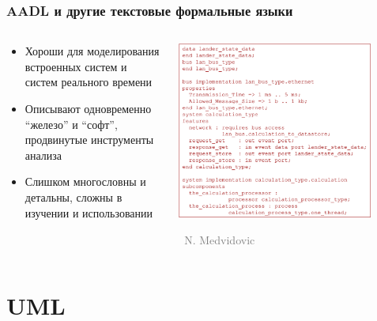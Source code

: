 \documentclass[xetex,mathserif,serif]{beamer}
\newcommand{\attribution}[1] {
    \vspace{-5mm}\begin{flushright}\begin{scriptsize}\textcolor{gray}{\textcopyright\, #1}\end{scriptsize}\end{flushright}
}
\begin{document}
    \begin{frame}
        \frametitle{AADL и другие текстовые формальные языки}
        \begin{columns}
            \begin{column}{0.4\textwidth}
                \begin{small}
                    \begin{itemize}
                        \item Хороши для моделирования встроенных систем и систем реального времени
                        \item Описывают одновременно ``железо'' и ``софт'', продвинутые инструменты анализа
                        \item Слишком многословны и детальны, сложны в изучении и использовании
                    \end{itemize}
                \end{small}
            \end{column}
            \begin{column}{0.6\textwidth}
                \begin{center}
                    \includegraphics[width=0.85\textwidth]{aadl.png}
                    \attribution{N. Medvidovic}
                \end{center}
            \end{column}
        \end{columns}
    \end{frame}

    \section{UML}
\end{document}
